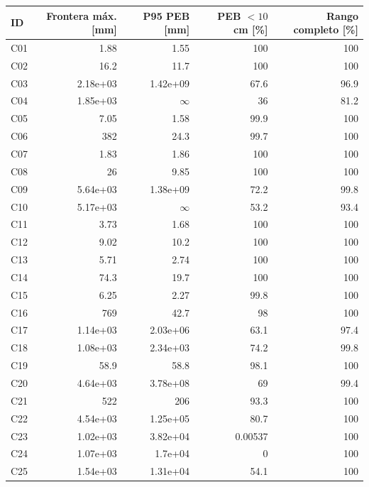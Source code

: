 \begin{longtable}{lrrrr}\toprule
ID & Frontera máx. [mm] & P95 PEB [mm] & PEB $<10$ cm [\%] & Rango completo [\%]\\\midrule\endhead
C01 & 1.88 & 1.55 & 100 & 100 \\
C02 & 16.2 & 11.7 & 100 & 100 \\
C03 & 2.18e+03 & 1.42e+09 & 67.6 & 96.9 \\
C04 & 1.85e+03 & $\infty$ & 36 & 81.2 \\
C05 & 7.05 & 1.58 & 99.9 & 100 \\
C06 & 382 & 24.3 & 99.7 & 100 \\
C07 & 1.83 & 1.86 & 100 & 100 \\
C08 & 26 & 9.85 & 100 & 100 \\
C09 & 5.64e+03 & 1.38e+09 & 72.2 & 99.8 \\
C10 & 5.17e+03 & $\infty$ & 53.2 & 93.4 \\
C11 & 3.73 & 1.68 & 100 & 100 \\
C12 & 9.02 & 10.2 & 100 & 100 \\
C13 & 5.71 & 2.74 & 100 & 100 \\
C14 & 74.3 & 19.7 & 100 & 100 \\
C15 & 6.25 & 2.27 & 99.8 & 100 \\
C16 & 769 & 42.7 & 98 & 100 \\
C17 & 1.14e+03 & 2.03e+06 & 63.1 & 97.4 \\
C18 & 1.08e+03 & 2.34e+03 & 74.2 & 99.8 \\
C19 & 58.9 & 58.8 & 98.1 & 100 \\
C20 & 4.64e+03 & 3.78e+08 & 69 & 99.4 \\
C21 & 522 & 206 & 93.3 & 100 \\
C22 & 4.54e+03 & 1.25e+05 & 80.7 & 100 \\
C23 & 1.02e+03 & 3.82e+04 & 0.00537 & 100 \\
C24 & 1.07e+03 & 1.7e+04 & 0 & 100 \\
C25 & 1.54e+03 & 1.31e+04 & 54.1 & 100 \\
\bottomrule\end{longtable}
